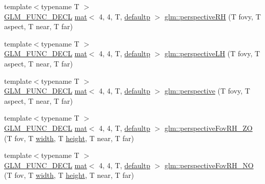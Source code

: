 \begin{DoxyCompactItemize}
\item 
{\footnotesize template$<$typename T $>$ }\\\hyperlink{setup_8hpp_ab2d052de21a70539923e9bcbf6e83a51}{G\+L\+M\+\_\+\+F\+U\+N\+C\+\_\+\+D\+E\+CL} \hyperlink{structglm_1_1mat}{mat}$<$ 4, 4, T, \hyperlink{namespaceglm_a36ed105b07c7746804d7fdc7cc90ff25a9d21ccd8b5a009ec7eb7677befc3bf51}{defaultp} $>$ \hyperlink{group__gtc__matrix__transform_ga26b88757fbd90601b80768a7e1ad3aa1}{glm\+::perspective\+RH} (T fovy, T aspect, T near, T far)
\item 
{\footnotesize template$<$typename T $>$ }\\\hyperlink{setup_8hpp_ab2d052de21a70539923e9bcbf6e83a51}{G\+L\+M\+\_\+\+F\+U\+N\+C\+\_\+\+D\+E\+CL} \hyperlink{structglm_1_1mat}{mat}$<$ 4, 4, T, \hyperlink{namespaceglm_a36ed105b07c7746804d7fdc7cc90ff25a9d21ccd8b5a009ec7eb7677befc3bf51}{defaultp} $>$ \hyperlink{group__gtc__matrix__transform_ga9bd34951dc7022ac256fcb51d7f6fc2f}{glm\+::perspective\+LH} (T fovy, T aspect, T near, T far)
\item 
{\footnotesize template$<$typename T $>$ }\\\hyperlink{setup_8hpp_ab2d052de21a70539923e9bcbf6e83a51}{G\+L\+M\+\_\+\+F\+U\+N\+C\+\_\+\+D\+E\+CL} \hyperlink{structglm_1_1mat}{mat}$<$ 4, 4, T, \hyperlink{namespaceglm_a36ed105b07c7746804d7fdc7cc90ff25a9d21ccd8b5a009ec7eb7677befc3bf51}{defaultp} $>$ \hyperlink{group__gtc__matrix__transform_ga747c8cf99458663dd7ad1bb3a2f07787}{glm\+::perspective} (T fovy, T aspect, T near, T far)
\item 
{\footnotesize template$<$typename T $>$ }\\\hyperlink{setup_8hpp_ab2d052de21a70539923e9bcbf6e83a51}{G\+L\+M\+\_\+\+F\+U\+N\+C\+\_\+\+D\+E\+CL} \hyperlink{structglm_1_1mat}{mat}$<$ 4, 4, T, \hyperlink{namespaceglm_a36ed105b07c7746804d7fdc7cc90ff25a9d21ccd8b5a009ec7eb7677befc3bf51}{defaultp} $>$ \hyperlink{group__gtc__matrix__transform_ga7dcbb25331676f5b0795aced1a905c44}{glm\+::perspective\+Fov\+R\+H\+\_\+\+ZO} (T fov, T \hyperlink{_s_d_l__opengl_8h_a9a82cf3caff84cabc4598e2619faac17}{width}, T \hyperlink{_s_d_l__opengl_8h_aa352f2804b9902ac30769c00dde75d5f}{height}, T near, T far)
\item 
{\footnotesize template$<$typename T $>$ }\\\hyperlink{setup_8hpp_ab2d052de21a70539923e9bcbf6e83a51}{G\+L\+M\+\_\+\+F\+U\+N\+C\+\_\+\+D\+E\+CL} \hyperlink{structglm_1_1mat}{mat}$<$ 4, 4, T, \hyperlink{namespaceglm_a36ed105b07c7746804d7fdc7cc90ff25a9d21ccd8b5a009ec7eb7677befc3bf51}{defaultp} $>$ \hyperlink{group__gtc__matrix__transform_ga257b733ff883c9a065801023cf243eb2}{glm\+::perspective\+Fov\+R\+H\+\_\+\+NO} (T fov, T \hyperlink{_s_d_l__opengl_8h_a9a82cf3caff84cabc4598e2619faac17}{width}, T \hyperlink{_s_d_l__opengl_8h_aa352f2804b9902ac30769c00dde75d5f}{height}, T near, T far)

\end{DoxyCompactItemize}

